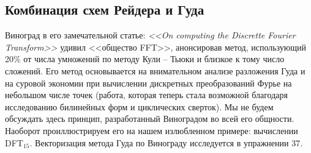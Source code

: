\documentclass{mai_book}
\begin{document}
\subsection{Комбинация схем Рейдера и Гуда}
Виноград в его замечательной статье: \textit{<<On computing the Discrette Fourier Transform>>} удивил <<общество FFT>>, анонсировав метод, использующий 20\% от числа умножений по методу Кули -- Тьюки и близкое к тому число сложений. Его метод основывается на внимательном анализе разложения Гуда и на суровой экономии при вычислении дискретных преобразований Фурье на небольшом числе точек (работа, которая теперь стала возможной благодаря исследованию билинейных форм и циклических сверток). Мы не будем обсуждать здесь принцип, разработанный Виноградом во всей его общности. Наоборот проиллюстрируем его на нашем излюбленном примере: вычислении D{\footnotesize FT}$_{15}$. Векторизация метода Гуда по Винограду исследуется в упражнении 37. 
\end{document}
